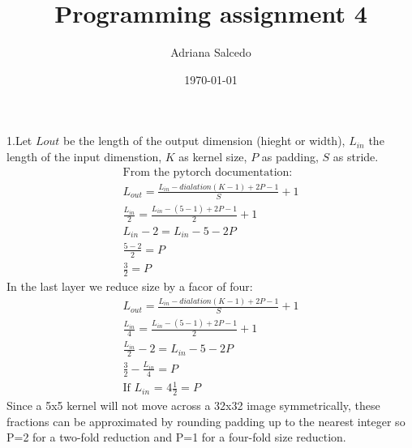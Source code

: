\documentclass[12pt,letterpaper]{article} %
\title{\Large Programming assignment 4}
\author{\large Adriana Salcedo}
\date{\large \today}
\begin{document}
\maketitle
\section{}
\subsection{}

1.Let $L{out}$ be the length of the output dimension (hieght or width), $L_{in}$ the length of the input dimenstion, $K$ as kernel size, $P$ as padding, $S$ as stride. 
\begin{align*}
\text{From the pytorch documentation:} \\
L_{out} = \frac{L_{in}-dialation(K -1) + 2P -1}{S} + 1\\
\frac{L_{in}}{2} = \frac{L_{in} - (5-1)+2P -1}{2} +1\\
L_{in} -2 = L_{in}-5-2P\\
\frac{5-2}{2} =P\\
\frac{3}{2}=P
\end{align*}
In the last layer we reduce size by a facor of four:
\begin{align*}
L_{out} = \frac{L_{in}-dialation(K -1) + 2P -1}{S} + 1\\
\frac{L_{in}}{4} = \frac{L_{in} - (5-1)+2P -1}{2} +1\\
\frac{L_{in}}{2} -2 = L_{in}-5-2P\\
\frac{3}{2}-\frac{L_{in}}{4} = P\\
\text{If $L_{in}$ = 4}
\frac{1}{2}=P
\end{align*}
Since a 5x5 kernel will not move across a 32x32 image symmetrically, these fractions can be approximated by rounding padding up to the nearest integer so P=2 for a two-fold reduction and P=1 for a four-fold size reduction.

\section{}
\end{document}
